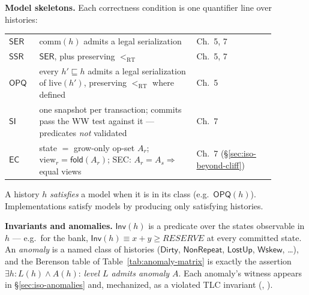 \medskip
\noindent\textbf{Model skeletons.} Each correctness condition is one
quantifier line over histories:

\smallskip
\begin{tabular}{M{0.10\linewidth}M{0.52\linewidth}M{0.26\linewidth}}
\hline
$\mathsf{SER}$ & $\mathrm{comm}(h)$ admits a legal serialization & Ch.~5, 7 \\
$\mathsf{SSR}$ & $\mathsf{SER}$, plus preserving $<_{\mathrm{RT}}$ & Ch.~5, 7 \\
$\mathsf{OPQ}$ & every $h' \sqsubseteq h$ admits a legal serialization of $\mathrm{live}(h')$, preserving $<_{\mathrm{RT}}$ where defined & Ch.~5 \\
$\mathsf{SI}$ & one snapshot per transaction; commits pass the WW test against it --- predicates \emph{not} validated & Ch.~7 \\
$\mathsf{EC}$ & state $=$ grow-only op-set $A_r$; $\mathrm{view}_r = \mathsf{fold}(A_r)$; \textsf{SEC}: $A_r = A_s \Rightarrow$ equal views & Ch.~7 (\S\ref{sec:iso-beyond-cliff}) \\
\hline
\end{tabular}
\smallskip

\noindent A history $h$ \emph{satisfies} a model when it is in its class
(e.g.\ $\mathsf{OPQ}(h)$). Implementations satisfy models by producing only
satisfying histories.

\medskip
\noindent\textbf{Invariants and anomalies.} $\mathsf{Inv}(h)$ is a
predicate over the states observable in $h$ --- e.g.\ for the bank,
$\mathsf{Inv}(h) \equiv x + y \geq \mathit{RESERVE}$ at every committed
state. An \emph{anomaly} is a named class of histories
($\mathsf{Dirty}$, $\mathsf{NonRepeat}$, $\mathsf{LostUp}$,
$\mathsf{Wskew}$, \ldots), and the Berenson table of
Table~\ref{tab:anomaly-matrix} is exactly the assertion
$\exists h: L(h) \wedge A(h)$: \emph{level $L$ admits anomaly
$A$}. Each anomaly's witness appears in \S\ref{sec:iso-anomalies} and,
mechanized, as a violated TLC invariant
(, ).
